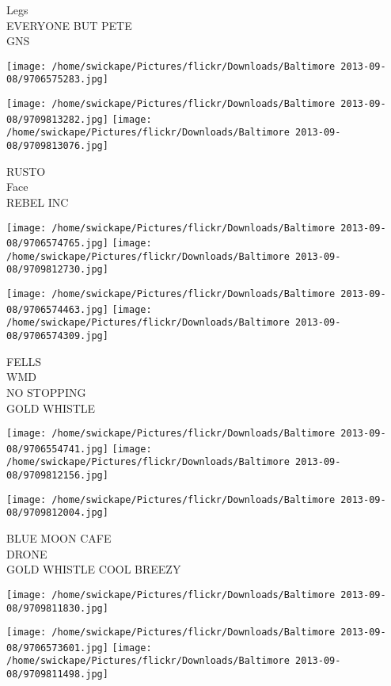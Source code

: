 \documentclass[10pt,letterpaper]{article}
\begin{document}
Legs\\
EVERYONE BUT PETE\\
GNS\\
\pagebreak

\texttt{[image: /home/swickape/Pictures/flickr/Downloads/Baltimore 2013-09-08/9706575283.jpg]}

\vspace{0.25in}
\texttt{[image: /home/swickape/Pictures/flickr/Downloads/Baltimore 2013-09-08/9709813282.jpg]}
\texttt{[image: /home/swickape/Pictures/flickr/Downloads/Baltimore 2013-09-08/9709813076.jpg]}

RUSTO\\
Face\\
REBEL INC\\
\pagebreak

\texttt{[image: /home/swickape/Pictures/flickr/Downloads/Baltimore 2013-09-08/9706574765.jpg]}
\texttt{[image: /home/swickape/Pictures/flickr/Downloads/Baltimore 2013-09-08/9709812730.jpg]}

\texttt{[image: /home/swickape/Pictures/flickr/Downloads/Baltimore 2013-09-08/9706574463.jpg]}
\texttt{[image: /home/swickape/Pictures/flickr/Downloads/Baltimore 2013-09-08/9706574309.jpg]}

FELLS\\
WMD\\
NO STOPPING\\
GOLD WHISTLE\\
\pagebreak

\texttt{[image: /home/swickape/Pictures/flickr/Downloads/Baltimore 2013-09-08/9706554741.jpg]}
\texttt{[image: /home/swickape/Pictures/flickr/Downloads/Baltimore 2013-09-08/9709812156.jpg]}

\texttt{[image: /home/swickape/Pictures/flickr/Downloads/Baltimore 2013-09-08/9709812004.jpg]}

BLUE MOON CAFE\\
DRONE\\
GOLD WHISTLE COOL BREEZY\\
\pagebreak

\texttt{[image: /home/swickape/Pictures/flickr/Downloads/Baltimore 2013-09-08/9709811830.jpg]}

\vspace{0.25in}
\texttt{[image: /home/swickape/Pictures/flickr/Downloads/Baltimore 2013-09-08/9706573601.jpg]}
\texttt{[image: /home/swickape/Pictures/flickr/Downloads/Baltimore 2013-09-08/9709811498.jpg]}
\end{document}
